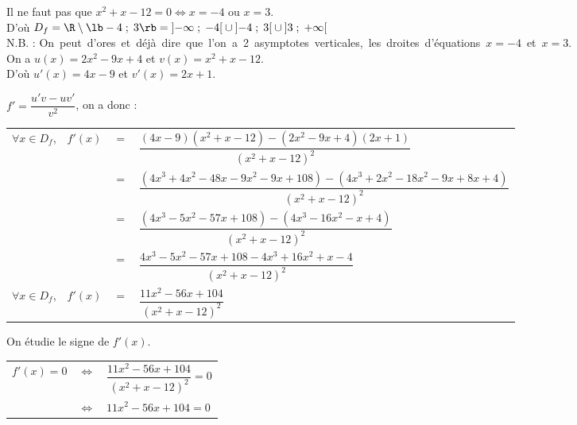 Il ne faut pas que $x^2 + x - 12 = 0 \Longleftrightarrow x = -4$ ou $x = 3$. \\

D'où $D_f = \R \setminus \lb -4 \; ; \; 3 \rb = \left]-\infty \; ; \; -4\right[\cup\left]-4 \; ; \; 3\right[\cup\left]3 \; ; \; +\infty\right[$ \\

N.B. : \hbox{On peut d'ores et déjà dire que l'on a 2 asymptotes verticales, les droites d'équations $x = -4$ et $x = 3$.} \\ 

On a $u(x) = 2x^2 - 9x +4$ et $v(x) = x^2 + x - 12$. \\
D'où $u'(x) = 4x - 9$ et $v'(x) = 2x +1 $. 

\vspace*{.3cm}

$f' = \dfrac{u'v - uv'}{v^2}$, on a donc :

\begin{tabular}{llll}
$\forall x \in D_f$, & $f'(x)$ & $=$ & $\dfrac{\left(4x - 9\right)\left(x^2 + x -12\right)-\left(2x^2 - 9x +4\right)\left(2x +1\right)}{\left(x^2 + x - 12\right)^2}$ \vspace*{.3cm} \\
& & $=$ & $\dfrac{\left(4x^3 + 4x^2 - 48x - 9x^2 - 9x + 108\right)-\left(4x^3 + 2x^2 - 18x^2 - 9x + 8x +4\right)}{\left(x^2 + x - 12\right)^2}$ \vspace*{.3cm} \\
& & $=$ & $\dfrac{\left(4x^3 - 5x^2 - 57x + 108\right)-\left(4x^3 - 16x^2 - x + 4\right)}{\left(x^2 + x - 12\right)^2}$ \vspace*{.3cm} \\
& & $=$ & $\dfrac{4x^3 - 5x^2 - 57x + 108 - 4x^3 + 16x^2 + x - 4}{\left(x^2 + x - 12\right)^2}$ \vspace*{.3cm} \\
$\forall x \in D_f$, & $f'(x)$ & $=$ & $\dfrac{11x^2 - 56x + 104}{\left(x^2 + x - 12\right)^2}$ \\
\end{tabular}

On étudie le signe de $f'(x)$. \\

\begin{tabular}{lll}
$f'(x) = 0$ & $\Longleftrightarrow$ & $\dfrac{11x^2 - 56x + 104}{\left(x^2 + x - 12\right)^2} = 0$ \vspace*{.3cm} \\
& $\Longleftrightarrow$ & $11x^2 - 56x + 104 = 0$ \vspace*{.3cm} \\
\end{tabular}

